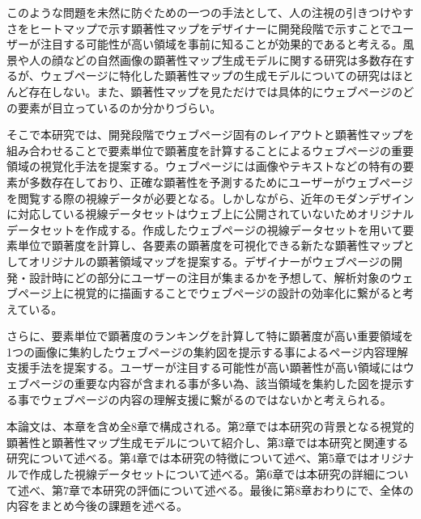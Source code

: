 \par このような問題を未然に防ぐための一つの手法として、人の注視の引きつけやすさをヒートマップで示す顕著性マップをデザイナーに開発段階で示すことでユーザーが注目する可能性が高い領域を事前に知ることが効果的であると考える。風景や人の顔などの自然画像の顕著性マップ生成モデルに関する研究は多数存在するが、ウェブページに特化した顕著性マップの生成モデルについての研究はほとんど存在しない。また、顕著性マップを見ただけでは具体的にウェブページのどの要素が目立っているのか分かりづらい。

\par そこで本研究では、開発段階でウェブページ固有のレイアウトと顕著性マップを組み合わせることで要素単位で顕著度を計算することによるウェブページの重要領域の視覚化手法を提案する。ウェブページには画像やテキストなどの特有の要素が多数存在しており、正確な顕著性を予測するためにユーザーがウェブページを閲覧する際の視線データが必要となる。しかしながら、近年のモダンデザインに対応している視線データセットはウェブ上に公開されていないためオリジナルデータセットを作成する。作成したウェブページの視線データセットを用いて要素単位で顕著度を計算し、各要素の顕著度を可視化できる新たな顕著性マップとしてオリジナルの顕著領域マップを提案する。デザイナーがウェブページの開発・設計時にどの部分にユーザーの注目が集まるかを予想して、解析対象のウェブページ上に視覚的に描画することでウェブページの設計の効率化に繋がると考えている。

\par さらに、要素単位で顕著度のランキングを計算して特に顕著度が高い重要領域を1つの画像に集約したウェブページの集約図を提示する事によるページ内容理解支援手法を提案する。ユーザーが注目する可能性が高い顕著性が高い領域にはウェブページの重要な内容が含まれる事が多い為、該当領域を集約した図を提示する事でウェブページの内容の理解支援に繋がるのではないかと考えられる。

\par 本論文は、本章を含め全8章で構成される。第2章では本研究の背景となる視覚的顕著性と顕著性マップ生成モデルについて紹介し、第3章では本研究と関連する研究について述べる。第4章では本研究の特徴について述べ、第5章ではオリジナルで作成した視線データセットについて述べる。第6章では本研究の詳細について述べ、第7章で本研究の評価について述べる。最後に第8章おわりにで、全体の内容をまとめ今後の課題を述べる。